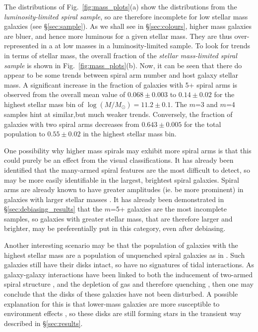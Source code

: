 \documentclass[useAMS,usenatbib]{mn2e}
\begin{document}
The distributions of Fig.~\ref{fig:mass_plots}(a) show the distributions from the \textit{luminosity-limited spiral sample}, so are therefore incomplete for low stellar mass galaxies (see \S\ref{sec:sample}). As we shall see in \S\ref{sec:colours}, higher mass galaxies are bluer, and hence more luminous for a given stellar mass. They are thus over-represented in a at low masses in a luminosity-limited sample. To look for trends in terms of stellar mass, the overall fraction of the \textit{stellar mass-limited spiral sample} is shown in Fig.~\ref{fig:mass_plots}(b). Now, it can be seen that there do appear to be some trends between spiral arm number and host galaxy stellar mass. A significant increase in the fraction of galaxies with 5+ spiral arms is observed from the overall mean value of $0.068 \pm 0.003$ to $0.14 \pm 0.02$ for the highest stellar mass bin of $\log(M/M_{\odot}) = 11.2 \pm 0.1$. The $m$=3 and $m$=4 samples hint at similar,but much weaker trends. Conversely, the fraction of galaxies with two spiral arms decreases from $0.643 \pm 0.005$ for the total population to $0.55 \pm 0.02$ in the highest stellar mass bin. 

One possibility why higher mass spirals may exhibit more spiral arms is that this could purely be an effect from the visual classifications. It has already been  identified that the many-armed spiral features are the most difficult to detect, so  may be more easily identifiable in the largest, brightest spiral galaxies. Spiral arms are already known to have greater amplitudes (ie. be more prominent) in galaxies with larger stellar masses \citep{Kendall_15}. It has already been demonstrated in \S\ref{sec:debiasing_results} that the $m$=5+ galaxies are the most incomplete samples, so galaxies with greater stellar mass, that are therefore larger and brighter, may be preferentially put in this category, even after debiasing.

Another interesting scenario may be that the population of galaxies with the highest stellar mass are a population of unquenched spiral galaxies as in \citet{Ogle_16}. Such galaxies still have their disks intact, so have no signatures of tidal interactions. As galaxy-galaxy interactions have been linked to both the inducement of two-armed spiral structure \citep{Dobbs_10,Semczuk_15}, and the depletion of gas and therefore quenching \citep{Di_Matteo_07,Li_08}, then one may conclude that the disks of these galaxies have not been disturbed. A possible explanation for this is that lower-mass galaxies are more susceptible to environment effects \citep{Bamford_09}, so these disks are still forming stars in the transient way described in \S\ref{sec:results}. 
\end{document}

